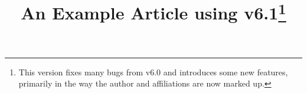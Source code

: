 \documentclass[twocolumn, trackchanges]{../_demoResources/configs/AASTex6.1/aastex61}
\begin{document}
	
	\title{An Example Article using \aastex v6.1\footnote{This version fixes many bugs from v6.0 and introduces some new features, primarily in the way the author and affiliations are now marked up.}}
	
	
	
\end{document}
